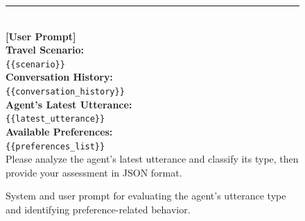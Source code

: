 \begin{figure}[t]
{\begin{tcolorbox}[colback=blue!5!white, colframe=blue!75!black, 
title=System and User Prompt for Judging Agent Responses, boxrule=0.3mm, width=\textwidth, arc=3mm, auto outer arc=true]
\rule{\linewidth}{0.2pt} \\

\textbf{[User Prompt]}\\[3mm]
\textbf{Travel Scenario:}\\
\texttt{\{\{scenario\}\}}\\[1mm]

\textbf{Conversation History:}\\
\texttt{\{\{conversation\_history\}\}}\\[1mm]

\textbf{Agent's Latest Utterance:}\\
\texttt{\{\{latest\_utterance\}\}}\\[1mm]

\textbf{Available Preferences:}\\
\texttt{\{\{preferences\_list\}\}}\\[1mm]

Please analyze the agent's latest utterance and classify its type, then provide your assessment in JSON format.

\end{tcolorbox}
}
\caption{System and user prompt for evaluating the agent's utterance type and identifying preference-related behavior.}
\label{fig:judge_agent_response}
\end{figure}


